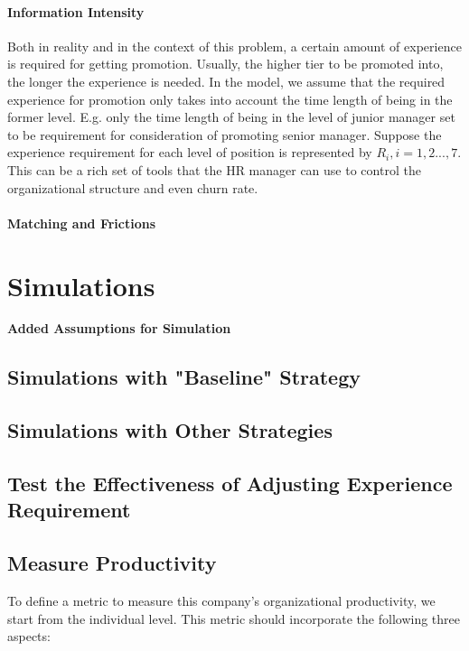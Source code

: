 \documentclass[tcn = 37075, sheet = true, abstract = true]{mcmthesis}
\begin{document}
\paragraph{Information Intensity} 

Both in reality and in the context of this problem, a certain amount of experience is required for getting promotion. Usually, the higher tier to be promoted into, the longer the experience is needed. In the model, we assume that the required experience for promotion only takes into account the time length of being in the former level. E.g. only the time length of being in the level of junior manager set to be requirement for consideration of promoting senior manager. Suppose the experience requirement for each level of position is represented by $R_i, i = 1, 2...,7$. This can be a rich set of tools that the HR manager can use to control the organizational structure and even churn rate.

\paragraph{Matching and Frictions} 



\section{Simulations}

\textbf{Added Assumptions for Simulation}

\subsection{Simulations with "Baseline" Strategy}


\subsection{Simulations with Other Strategies}

\subsection{Test the Effectiveness of Adjusting Experience Requirement}


\subsection{Measure Productivity}

To define a metric to measure this company's organizational productivity, we start from the individual level. This metric should incorporate the following three aspects:
\end{document}
